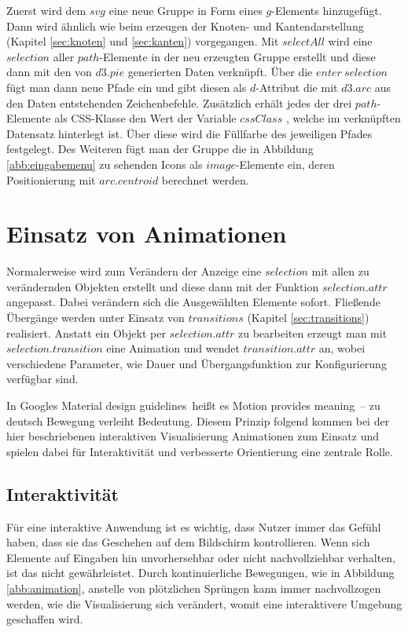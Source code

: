 Zuerst wird dem $svg$ eine neue Gruppe in Form eines $g$-Elements hinzugefügt. Dann wird ähnlich wie beim erzeugen der Knoten- und Kantendarstellung (Kapitel \ref{sec:knoten} und \ref{sec:kanten}) vorgegangen. Mit $selectAll$ wird eine $selection$ aller $path$-Elemente in der neu erzeugten Gruppe erstellt und diese dann mit den von $d3.pie$ generierten Daten verknüpft. Über die $enter\ selection$ fügt man dann neue Pfade ein und gibt diesen als $d$-Attribut die mit $d3.arc$ aus den Daten entstehenden Zeichenbefehle. Zusätzlich erhält jedes der drei $path$-Elemente als CSS-Klasse den Wert der Variable $cssClass$ , welche im verknüpften Datensatz hinterlegt ist.  Über diese wird die Füllfarbe des jeweiligen Pfades festgelegt. Des Weiteren fügt man der Gruppe die in Abbildung \ref{abb:eingabemenu} zu sehenden Icons als $image$-Elemente ein, deren Positionierung mit $arc.centroid$ berechnet werden.
 
\section{Einsatz von Animationen}\label{sec:animation}
Normalerweise wird zum Verändern der Anzeige eine $selection$ mit allen zu verändernden Objekten erstellt und diese dann mit der Funktion $selection.attr$ angepasst. Dabei verändern sich die Ausgewählten Elemente sofort. Fließende Übergänge werden unter Einsatz von $transitions$ (Kapitel \ref{sec:transitions}) realisiert. Anstatt ein Objekt per $selection.attr$ zu bearbeiten erzeugt man mit $selection.transition$
eine Animation und wendet $transition.attr$ an, wobei verschiedene Parameter, wie Dauer und Übergangsfunktion zur Konfigurierung verfügbar sind. 

In Googles \glqq Material design guidelines\grqq\ heißt es \glqq Motion provides meaning\grqq\ -- zu deutsch \glqq Bewegung verleiht Bedeutung\grqq.  Diesem Prinzip folgend kommen bei der hier beschriebenen interaktiven Visualisierung Animationen zum Einsatz und spielen dabei für Interaktivität und verbesserte Orientierung eine zentrale Rolle.

\subsection{Interaktivität}
Für eine interaktive Anwendung ist es wichtig, dass Nutzer immer das Gefühl haben, dass sie das Geschehen auf dem Bildschirm kontrollieren. Wenn sich Elemente auf Eingaben hin unvorhersehbar oder nicht nachvollziehbar verhalten, ist das nicht gewährleistet. Durch kontinuierliche Bewegungen, wie in Abbildung \ref{abb:animation}, anstelle von plötzlichen Sprüngen kann immer nachvollzogen werden, wie die Visualisierung sich verändert, womit eine interaktivere Umgebung geschaffen wird. 

